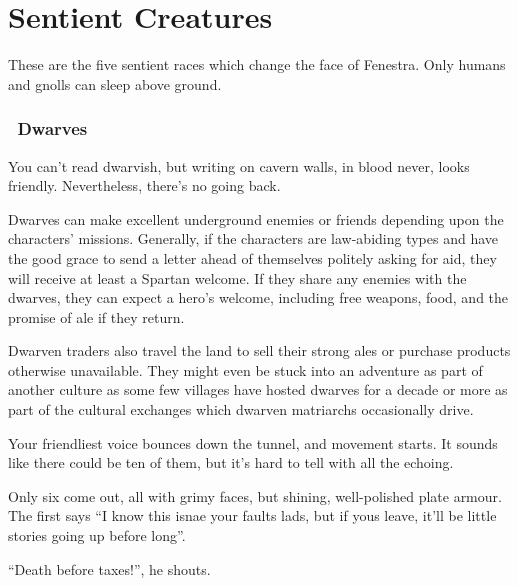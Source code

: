 \chapter{Sentient Creatures}
\toggletrue{genExamples}

\noindent
These are the five sentient races which change the face of Fenestra.
Only humans and gnolls can sleep above ground.

\begin{multicols}{2}

\subsection[Dwarves]{\Dw\ Dwarves}
\label{best_dwarves}

\begin{boxtext}

  You can't read dwarvish, but writing on cavern walls, in blood never, looks friendly.
  Nevertheless, there's no going back.

\end{boxtext}

Dwarves can make excellent underground enemies or friends depending upon the characters' missions.
Generally, if the characters are law-abiding types and have the good grace to send a letter ahead of themselves politely asking for aid, they will receive at least a Spartan welcome.
If they share any enemies with the dwarves, they can expect a hero's welcome, including free weapons, food, and the promise of ale if they return.

Dwarven traders also travel the land to sell their strong ales or purchase products otherwise unavailable.
They might even be stuck into an adventure as part of another culture as some few \glspl{village} have hosted dwarves for a decade or more as part of the cultural exchanges which dwarven matriarchs occasionally drive.

\begin{boxtext}

  Your friendliest voice bounces down the tunnel, and movement starts.
  It sounds like there could be ten of them, but it's hard to tell with all the echoing.

  Only six come out, all with grimy faces, but shining, well-polished plate armour.
  The first says ``I know this isnae your faults lads, but if yous leave, it'll be little stories going up before long''.

  ``Death before taxes!'', he shouts.


\end{boxtext}
\end{multicols}
